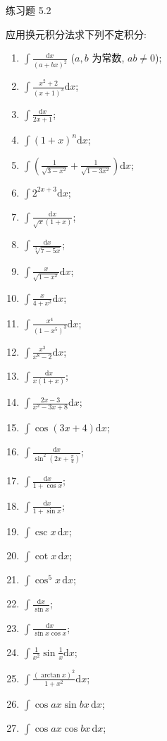 \begin{exblock}{练习题 5.2}
  \item 应用换元积分法求下列不定积分:
  \begin{enumerate}[label=(\arabic*)]
    \item $\int\frac{\mathrm{d}x}{(a+bx)^{2}}$ ($a,b$ 为常数, $ab\neq 0$);
    \item $\int\frac{x^{2}+2}{(x+1)^{3}}\mathrm{d}x$;
    \item $\int\frac{\mathrm{d}x}{2x+1}$;
    \item $\int(1+x)^{n}\mathrm{d}x$;
    \item $\int\left(\frac{1}{\sqrt{3-x^{2}}}+\frac{1}{\sqrt{1-3x^{2}}}\right)\mathrm{d}x$;
    \item $\int 2^{2x+3}\mathrm{d}x$;
    \item $\int\frac{\mathrm{d}x}{\sqrt{x}(1+x)}$;
    \item $\int\frac{\mathrm{d}x}{\sqrt[3]{7-5x}}$;
    \item $\int\frac{x}{\sqrt{1-x^{2}}}\mathrm{d}x$;
    \item $\int\frac{x}{4+x^{2}}\mathrm{d}x$;
    \item $\int\frac{x^{4}}{(1-x^{5})^{3}}\mathrm{d}x$;
    \item $\int\frac{x^{3}}{x^{8}-2}\mathrm{d}x$;
    \item $\int\frac{\mathrm{d}x}{x(1+x)}$;
    \item $\int\frac{2x-3}{x^{2}-3x+8}\mathrm{d}x$;
    \item $\int\cos(3x+4)\mathrm{d}x$;
    \item $\int\frac{\mathrm{d}x}{\sin^{2}\left(2x+\frac{\pi}{4}\right)}$;
    \item $\int\frac{\mathrm{d}x}{1+\cos x}$;
    \item $\int\frac{\mathrm{d}x}{1+\sin x}$;
    \item $\int\csc x\,\mathrm{d}x$;
    \item $\int\cot x\,\mathrm{d}x$;
    \item $\int\cos^{5}x\,\mathrm{d}x$;
    \item $\int\frac{\mathrm{d}x}{\sin x}$;
    \item $\int\frac{\mathrm{d}x}{\sin x\cos x}$;
    \item $\int\frac{1}{x^{2}}\sin\frac{1}{x}\mathrm{d}x$;
    \item $\int\frac{(\arctan x)^{2}}{1+x^{2}}\mathrm{d}x$;
    \item $\int\cos ax\sin bx\,\mathrm{d}x$;
    \item $\int\cos ax\cos bx\,\mathrm{d}x$;

\end{enumerate}
\end{exblock}
